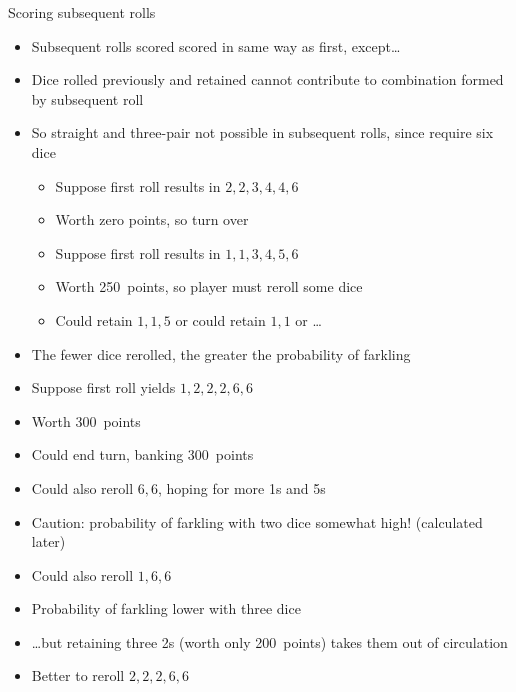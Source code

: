 \documentclass{beamer}
\theoremstyle{definition}
\begin{document}
\begin{frame}{Scoring subsequent rolls}
\begin{itemize}
\item Subsequent rolls scored scored in same way as first,
except\dots
\item Dice rolled previously and retained cannot
contribute to combination formed by subsequent roll
\item So straight and three-pair not possible in subsequent
rolls, since require six dice
\begin{example}
\begin{itemize}
\item Suppose first roll results in $2,2,3,4,4,6$
\item Worth zero points, so turn over
\end{itemize}
\end{example}
\begin{example}
\begin{itemize}
\item Suppose first roll results in $1,1,3,4,5,6$
\item Worth 250~points, so player must reroll \alert{some}
dice
\item Could retain $1,1,5$ or could
retain $1,1$ or \dots
\end{itemize}
\end{example}
\item The fewer dice rerolled, the greater
the probability of farkling
\end{itemize}
\end{frame}

\begin{frame}
\begin{example}
\begin{itemize}
\item Suppose first roll yields $1,2,2,2,6,6$
\item Worth 300~points
\item Could end turn, banking 300~points
\item Could also reroll $6,6$, hoping for more 1s and 5s
\item \alert{Caution:}
probability of farkling with two dice somewhat high!
(calculated later)
\item Could also reroll $1,6,6$
\item Probability of farkling lower with three dice
\item \dots but retaining three 2s 
(worth only 200~points)
takes them out of circulation
\item Better to reroll $2,2,2,6,6$
\end{itemize}
\end{example}
\end{frame}
\end{document}
